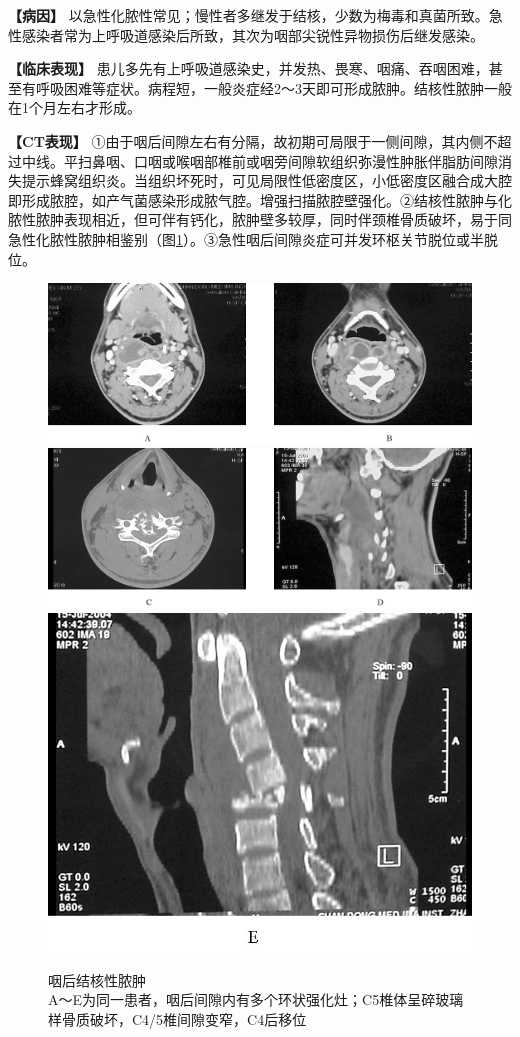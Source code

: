 \textbf{【病因】}
以急性化脓性常见；慢性者多继发于结核，少数为梅毒和真菌所致。急性感染者常为上呼吸道感染后所致，其次为咽部尖锐性异物损伤后继发感染。

\textbf{【临床表现】}
患儿多先有上呼吸道感染史，并发热、畏寒、咽痛、吞咽困难，甚至有呼吸困难等症状。病程短，一般炎症经2～3天即可形成脓肿。结核性脓肿一般在1个月左右才形成。

\textbf{【CT表现】}
①由于咽后间隙左右有分隔，故初期可局限于一侧间隙，其内侧不超过中线。平扫鼻咽、口咽或喉咽部椎前或咽旁间隙软组织弥漫性肿胀伴脂肪间隙消失提示蜂窝组织炎。当组织坏死时，可见局限性低密度区，小低密度区融合成大腔即形成脓腔，如产气菌感染形成脓气腔。增强扫描脓腔壁强化。②结核性脓肿与化脓性脓肿表现相近，但可伴有钙化，脓肿壁多较厚，同时伴颈椎骨质破坏，易于同急性化脓性脓肿相鉴别（图\ref{fig6-6}）。③急性咽后间隙炎症可并发环枢关节脱位或半脱位。



\begin{figure}[!htbp]
 \centering
\includegraphics[width=.7\textwidth,height=\textheight,keepaspectratio]{./images/Image00143.jpg}
\includegraphics[width=.7\textwidth,height=\textheight,keepaspectratio]{./images/Image00144.jpg}
\includegraphics[width=.7\textwidth,height=\textheight,keepaspectratio]{./images/Image00145.jpg}
 \captionsetup{justification=centering}
 \caption{咽后结核性脓肿\\{\small A～E为同一患者，咽后间隙内有多个环状强化灶；C5椎体呈碎玻璃样骨质破坏，C4/5椎间隙变窄，C4后移位}}
 \label{fig6-6}
  \end{figure} 

